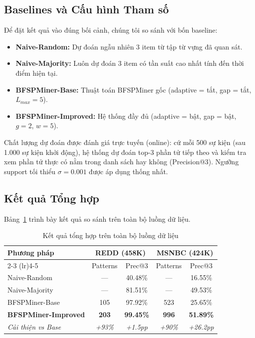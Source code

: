 \documentclass[conference]{IEEEtran}
\begin{document}
\subsection{Baselines và Cấu hình Tham số}
Để đặt kết quả vào đúng bối cảnh, chúng tôi so sánh với bốn baseline:
\begin{itemize}
    \item \textbf{Naive-Random:} Dự đoán ngẫu nhiên 3 item từ tập từ vựng đã quan sát.
    \item \textbf{Naive-Majority:} Luôn dự đoán 3 item có tần suất cao nhất tính đến thời điểm hiện tại.
    \item \textbf{BFSPMiner-Base:} Thuật toán BFSPMiner gốc (adaptive = tắt, gap = tắt, $L_{max} = 5$).
    \item \textbf{BFSPMiner-Improved:} Hệ thống đầy đủ (adaptive = bật, gap = bật, $g = 2$, $w = 5$).
\end{itemize}
Chất lượng dự đoán được đánh giá trực tuyến (online): cứ mỗi 500 sự kiện (sau 1.000 sự kiện khởi động), hệ thống dự đoán top-3 phần tử tiếp theo và kiểm tra xem phần tử thực có nằm trong danh sách hay không (Precision@3). Ngưỡng support tối thiểu $\sigma = 0.001$ được áp dụng thống nhất.

\subsection{Kết quả Tổng hợp}
Bảng~\ref{tab:overall} trình bày kết quả so sánh trên toàn bộ luồng dữ liệu.

\begin{table}[htbp]
    \centering
    \caption{Kết quả tổng hợp trên toàn bộ luồng dữ liệu}
    \label{tab:overall}
    \begin{tabular}{lcccc}
        \toprule
        \multirow{2}{*}{\textbf{Phương pháp}} & \multicolumn{2}{c}{\textbf{REDD (458K)}} & \multicolumn{2}{c}{\textbf{MSNBC (424K)}} \\
        \cmidrule(lr){2-3} \cmidrule(lr){4-5}
         & Patterns & Prec@3 & Patterns & Prec@3 \\
        \midrule
        Naive-Random & --- & 40.48\% & --- & 16.55\% \\
        Naive-Majority & --- & 81.51\% & --- & 49.53\% \\
        BFSPMiner-Base & 105 & 97.92\% & 523 & 25.65\% \\
        \textbf{BFSPMiner-Improved} & \textbf{203} & \textbf{99.45\%} & \textbf{996} & \textbf{51.89\%} \\
        \midrule
        \textit{Cải thiện vs Base} & \textit{+93\%} & \textit{+1.5pp} & \textit{+90\%} & \textit{+26.2pp} \\
        \bottomrule
    \end{tabular}
\end{table}
\end{document}
